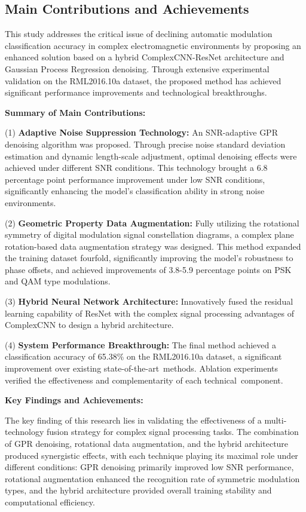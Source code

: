 \documentclass[conference]{IEEEtran}
\begin{document}
\subsection{Main Contributions and Achievements}

This study addresses the critical issue of declining automatic modulation classification accuracy in complex electromagnetic environments by proposing an enhanced solution based on a hybrid ComplexCNN-ResNet architecture and Gaussian Process Regression denoising. Through extensive experimental validation on the RML2016.10a dataset, the proposed method has achieved significant performance improvements and technological breakthroughs.

\textbf{Summary of Main Contributions:}

(1) \textbf{Adaptive Noise Suppression Technology:} An SNR-adaptive GPR denoising algorithm was proposed. Through precise noise standard deviation estimation and dynamic length-scale adjustment, optimal denoising effects were achieved under different SNR conditions. This technology brought a 6.8 percentage point performance improvement under low SNR conditions, significantly enhancing the model's classification ability in strong noise environments.

(2) \textbf{Geometric Property Data Augmentation:} Fully utilizing the rotational symmetry of digital modulation signal constellation diagrams, a complex plane rotation-based data augmentation strategy was designed. This method expanded the training dataset fourfold, significantly improving the model's robustness to phase offsets, and achieved improvements of 3.8-5.9 percentage points on PSK and QAM type modulations.

(3) \textbf{Hybrid Neural Network Architecture:} Innovatively fused the residual learning capability of ResNet with the complex signal processing advantages of ComplexCNN to design a hybrid architecture.

(4) \textbf{System Performance Breakthrough:} The final method achieved a classification accuracy of 65.38\% on the RML2016.10a dataset, a significant improvement over existing state-of-the-art~methods. Ablation experiments verified the effectiveness and complementarity of each technical~component.

\textbf{Key Findings and Achievements:}

The key finding of this research lies in validating the effectiveness of a multi-technology fusion strategy for complex signal processing tasks. The combination of GPR denoising, rotational data augmentation, and the hybrid architecture produced synergistic effects, with each technique playing its maximal role under different conditions: GPR denoising primarily improved low SNR performance, rotational augmentation enhanced the recognition rate of symmetric modulation types, and the hybrid architecture provided overall training stability and computational efficiency.
\end{document}
